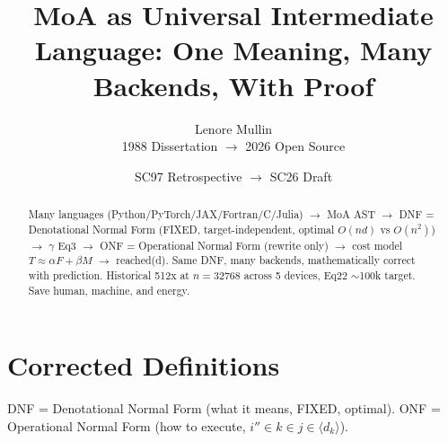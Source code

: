 \documentclass[11pt]{article}
\title{MoA as Universal Intermediate Language: One Meaning, Many Backends, With Proof}
\author{Lenore Mullin \\ 1988 Dissertation $\rightarrow$ 2026 Open Source}
\date{SC97 Retrospective $\rightarrow$ SC26 Draft}
\begin{document}
\maketitle

\begin{abstract}
Many languages (Python/PyTorch/JAX/Fortran/C/Julia) $\rightarrow$ MoA AST $\rightarrow$ DNF = Denotational Normal Form (FIXED, target-independent, optimal $O(nd)$ vs $O(n^2)$) $\rightarrow$ $\gamma$ Eq3 $\rightarrow$ ONF = Operational Normal Form (rewrite only) $\rightarrow$ cost model $T\approx\alpha F+\beta M$ $\rightarrow$ reached(d). Same DNF, many backends, mathematically correct with prediction. Historical 512x at $n=32768$ across 5 devices, Eq22 $\sim$100k target. Save human, machine, and energy.
\end{abstract}

\section{Corrected Definitions}
DNF = Denotational Normal Form (what it means, FIXED, optimal). ONF = Operational Normal Form (how to execute, $i''\in k\in j\in\langle d_k\rangle$).
\end{document}

